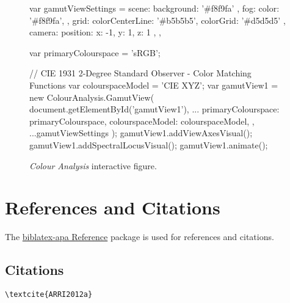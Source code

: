 \begin{figure}[H]
    \ifdefined\HCode%
        \JavaScript
            var gamutViewSettings = {
                    scene: {
                        background: '#f8f9fa'
                    },
                    fog: {
                        color: '#f8f9fa',
                    },
                    grid: {
                        colorCenterLine: '#b5b5b5',
                        colorGrid: '#d5d5d5'
                    },
                    camera: {
                        position: { x: -1, y: 1, z: 1 },
                    },
            }

            var primaryColourspace = 'sRGB';

            // CIE 1931 2-Degree Standard Observer - Color Matching Functions
            var colourspaceModel = 'CIE XYZ';
            var gamutView1 = new ColourAnalysis.GamutView(
                document.getElementById('gamutView1'),
                {
                    ...{
                        primaryColourspace: primaryColourspace,
                        colourspaceModel: colourspaceModel,
                    },
                    ...gamutViewSettings
                }
            );
            gamutView1.addViewAxesVisual();
            gamutView1.addSpectralLocusVisual();
            gamutView1.animate();
        \EndJavaScript
    \fi
    \caption{\textit{Colour Analysis} interactive figure.}%
    \label{fig:colour-analysis-interactive-figure}
\end{figure}

\section*{References and Citations}%
\label{sec:references-and-citations}

The \href{https://ctan.org/pkg/biblatex-apa}{biblatex-apa Reference} package is used for references and citations.

\subsection*{Citations}%
\label{subsec:citations}

\begin{lstlisting}[caption={Citation for Single Author.}]
\textcite{ARRI2012a}
\end{lstlisting}

\textcite{ARRI2012a}

